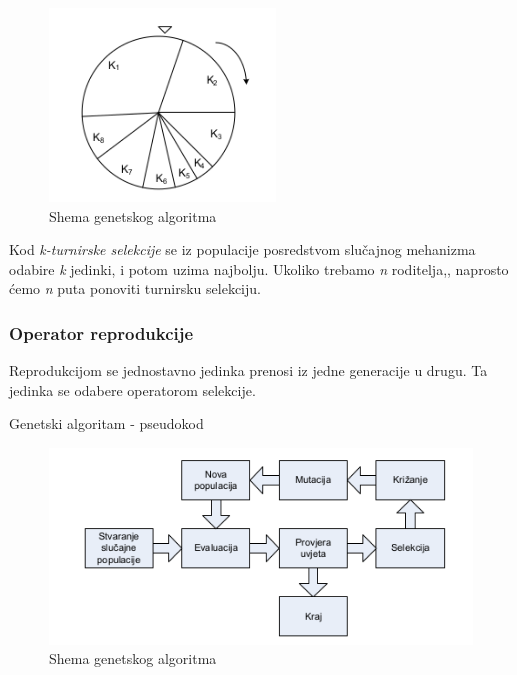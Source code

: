 \documentclass[times, utf8, zavrsni]{fer}
\begin{document}
\begin{figure}[htb]
\centering
\includegraphics[width=6cm]{img/selekcija.png}
\caption{Shema genetskog algoritma}
\label{fig:selekcija}
\end{figure}

Kod \emph{k-turnirske selekcije} se iz populacije posredstvom slučajnog mehanizma odabire \emph{k} jedinki, i potom uzima najbolju. Ukoliko trebamo \emph{n} roditelja,, naprosto ćemo \emph{n} puta ponoviti turnirsku selekciju.

\subsubsection{Operator reprodukcije}
Reprodukcijom se jednostavno jedinka prenosi iz jedne generacije u drugu. Ta jedinka se odabere operatorom selekcije.

\begin{algorithm}
\caption{Genetski algoritam - pseudokod}
\label{alg:genetski}
\begin{algorithmic}
\REPEAT
{}
\ENDWHILE
{}
\end{algorithmic}
\end{algorithm}

\begin{figure}[htb]
\centering
\includegraphics[width=12cm]{img/genetski_shema.png}
\caption{Shema genetskog algoritma}
\label{fig:genetski_shema}
\end{figure}
\end{document}
